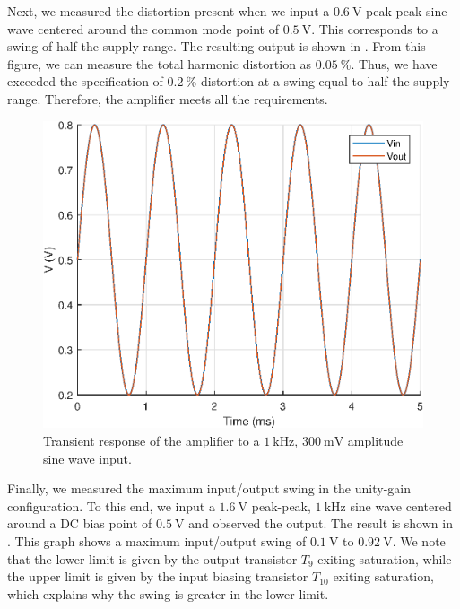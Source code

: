 \documentclass[journal,hidelinks]{IEEEtran}
\begin{document}
Next, we measured the distortion present when we input a $\SI{0.6}{\volt}$ peak-peak sine wave centered around the common mode point of $\SI{0.5}{\volt}$. This corresponds to a swing of half the supply range. The resulting output is shown in . From this figure, we can measure the total harmonic distortion as $\SI{0.05}{\percent}$. Thus, we have exceeded the specification of $\SI{0.2}{\percent}$ distortion at a swing equal to half the supply range. Therefore, the amplifier meets all the requirements.

\begin{figure}[!htb]
  \centering
  \includegraphics[width=\columnwidth]{figures/tran_3m.eps}
  \caption{Transient response of the amplifier to a $\SI{1}{\kilo\hertz}$, $\SI{300}{\milli\volt}$ amplitude sine wave input.}
  \label{fig:tran_3m}
\end{figure}

Finally, we measured the maximum input/output swing in the unity-gain configuration. To this end, we input a $\SI{1.6}{\volt}$ peak-peak, $\SI{1}{\kilo\hertz}$ sine wave centered around a DC bias point of $\SI{0.5}{\volt}$ and observed the output. The result is shown in . This graph shows a maximum input/output swing of $\SI{0.1}{\volt}$ to $\SI{0.92}{\volt}$. We note that the lower limit is given by the output transistor $T_9$ exiting saturation, while the upper limit is given by the input biasing transistor $T_{10}$ exiting saturation, which explains why the swing is greater in the lower limit.
\end{document}
